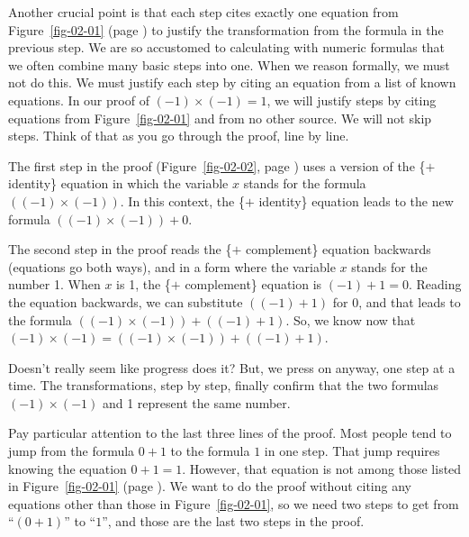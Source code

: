 Another crucial point is that each step cites
exactly one equation from Figure~\ref{fig-02-01} (page \pageref{fig-02-01})
to justify the transformation from the formula in the previous step.
We are so accustomed to calculating with numeric formulas that
we often combine many basic steps into one. When we reason formally,
we must not do this. We must justify each step by citing an equation
from a list of known equations. In our proof of $(-1)\times(-1) = 1$,
we will justify steps by citing equations from Figure~\ref{fig-02-01}
and from no other source. We will not skip steps.
Think of that as you go through the proof, line by line.

The first step in the proof
(Figure~\ref{fig-02-02}, page \pageref{fig-02-02}) uses a version of the
\{$+$ identity\} equation in which the variable $x$ stands for the
formula $((-1)\times(-1))$.
In this context, the \{$+$ identity\} equation
leads to the new formula $((-1)\times(-1)) + 0$.

The second step in the proof reads the \{$+$ complement\}
equation backwards (equations go both ways), and in a form
where the variable $x$ stands for the number 1.
When $x$ is 1, the \{$+$ complement\} equation is
$(-1) + 1 = 0$.
Reading the equation backwards, we can substitute
$((-1) + 1)$ for $0$,
and that leads to the formula $((-1)\times(-1)) + ((-1) + 1)$.
So, we know now that
$(-1)\times(-1) = ((-1)\times(-1)) + ((-1) + 1)$.

Doesn't really seem like progress does it?
But, we press on anyway, one step at a time.
The transformations, step by step, finally confirm that the two formulas
$(-1)\times(-1)$ and 1 represent the same number.

Pay particular attention to the last three lines of the proof.
Most people tend to jump from the formula $0+1$ to the
formula $1$ in one step. That jump requires knowing the equation
$0+1 = 1$. However, that equation is not among those listed in
Figure~\ref{fig-02-01} (page \pageref{fig-02-01}).
We want to do the proof without citing any equations
other than those in Figure~\ref{fig-02-01}, so we need two steps
to get from ``$(0+1)$'' to ``$1$'',
and those are the last two steps in the proof.


